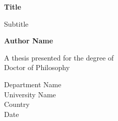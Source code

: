 \begin{titlepage}
   \begin{center}
       \vspace*{1cm}

       \textbf{ Title}

       \vspace{0.5cm}
        Subtitle
            
       \vspace{1.5cm}

       \textbf{Author Name}

       \vfill
            
       A thesis presented for the degree of\\
       Doctor of Philosophy
            
       \vspace{0.8cm}
     
       
            
       Department Name\\
       University Name\\
       Country\\
       Date
            
   \end{center}
\end{titlepage}